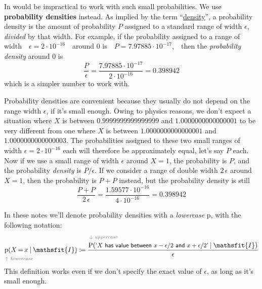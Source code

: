 \documentclass[
  a4paper,
  DIV=11,
  numbers=noendperiod,
  oneside]{scrreprt}
\begin{document}
In would be impractical to work with such small probabilities. We use
{\textbf{probability densities}} instead. As implied by the term
``\href{https://www.nist.gov/pml/special-publication-811/nist-guide-si-chapter-8}{density}'',
a probability density is the amount of probability \(P\) assigned to a
standard range of width \(\epsilon\), \emph{divided} by that width. For
example, if the probability assigned to a range of
width~~\(\epsilon=2\cdot10^{-16}\)~~around \(0\)
is~~{\(P=7.97885\cdot10^{-17}\),}~~then the \emph{probability density}
around \(0\) is \[
\frac{P}{\epsilon} =
\frac{7.97885\cdot10^{-17}}{2\cdot10^{-16}} = 0.398942
\] which is a simpler number to work with.

Probability densities are convenient because they usually do not depend
on the range width \(\epsilon\), if it's small enough. Owing to physics
reasons, we don't expect a situation where \(X\) is between
{\(0.9999999999999999\)} and {\(1.0000000000000001\)} to be very
different from one where \(X\) is between {\(1.0000000000000001\)} and
{\(1.0000000000000003\)}. The probabilities assigned to these two small
ranges of width \(\epsilon=2\cdot 10^{-16}\) each will therefore be
approximately equal, let's say \(P\) each. Now if we use a small range
of width \(\epsilon\) around \(X=1\), the probability is \(P\), and the
probability \emph{density} is \(P/\epsilon\). If we consider a range of
double width \(2\,\epsilon\) around \(X=1\), then the probability is
\(P+P\) instead, but the probability density is still
\[\frac{P+P}{2\,\epsilon} = 
\frac{1.59577\cdot10^{-16}}{4\cdot10^{-16}}
= 0.398942
\]

\hfill\break

In these notes we'll denote probability densities with a
{\emph{lowercase} \(\mathrm{p}\)}, with the following notation: \[
\underbracket[0ex]{\mathrm{p}}_{\mathrlap{\color[RGB]{119,119,119}\!\uparrow\ \textit{lowercase}}}(X\mathord{\,=\,}x \nonscript\:\vert\nonscript\:\mathopen{} \mathsfit{I}) \coloneqq
\frac{
\overbracket[0ex]{\mathrm{P}}^{\mathrlap{\color[RGB]{119,119,119}\!\downarrow\ \textit{uppercase}}}(\textsf{\small`\(X\) has value between \(x-\epsilon/2\) and \(x+\epsilon/2\)'} \nonscript\:\vert\nonscript\:\mathopen{} \mathsfit{I})
}{\epsilon}
\] This definition works even if we don't specify the exact value of
\(\epsilon\), as long as it's small enough.
\end{document}
